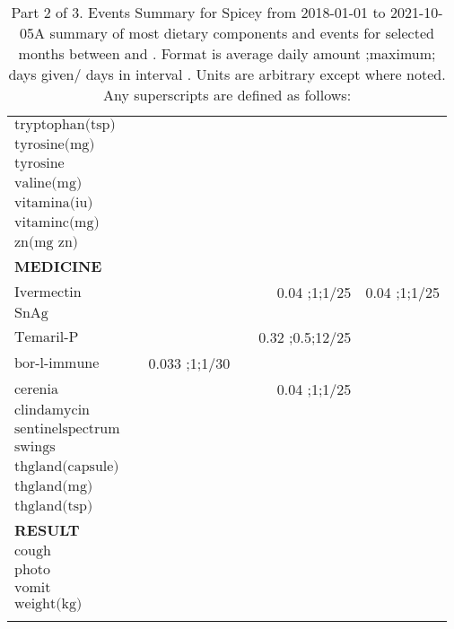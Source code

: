 \begin{table}[H]
\begin{tabular}{|l|r|r|r|r|r|}
$\textrm{tryptophan(tsp)}$&&&&&\\
$\textrm{tyrosine(mg)}$&&&&&\\
$\textrm{tyrosine}$&&&&&\\
$\textrm{valine(mg)}$&&&&&\\
$\textrm{vitamina(iu)}$&&&&&\\
$\textrm{vitaminc(mg)}$&&&&&\\
$\textrm{zn(mg~zn)}$&&&&&\\
{\bf MEDICINE}&&&&&\\
$\textrm{Ivermectin}$&&&&0.04 ;1;1/25&0.04 ;1;1/25\\
$\textrm{SnAg}$&&&&&\\
$\textrm{Temaril-P}$&&&&0.32 ;0.5;12/25&\\
$\textrm{bor-l-immune}$&&0.033 ;1;1/30&&&\\
$\textrm{cerenia}$&&&&0.04 ;1;1/25&\\
$\textrm{clindamycin}$&&&&&\\
$\textrm{sentinelspectrum}$&&&&&\\
$\textrm{swings}$&&&&&\\
$\textrm{thgland(capsule)}$&&&&&\\
$\textrm{thgland(mg)}$&&&&&\\
$\textrm{thgland(tsp)}$&&&&&\\
{\bf RESULT}&&&&&\\
$\textrm{cough}$&&&&&\\
$\textrm{photo}$&&&&&\\
$\textrm{vomit}$&&&&&\\
$\textrm{weight(kg)}$&&&&&\\
&&&&&\\
\hline
\end{tabular}
\caption{Part 2 of 3.  Events Summary for Spicey   from 2018-01-01 to 2021-10-05A summary of most dietary components and events  for selected months between \mjmdatemin and \mjmdatemax. Format is average daily amount ;maximum; days given/ days in interval . Units are arbitrary except where noted. Any  superscripts are defined as follows:  \mjmsuperscripts}
\end{table}
